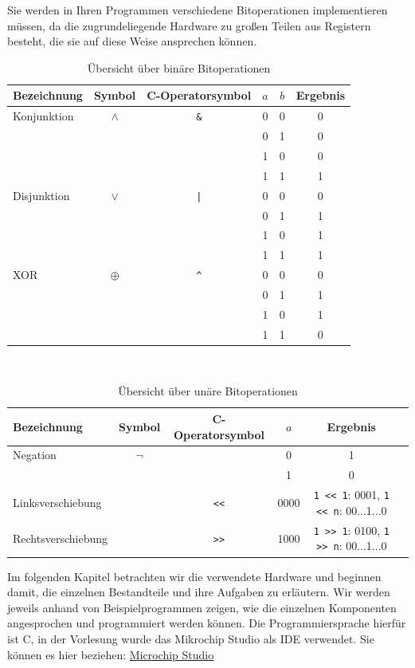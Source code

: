 \documentclass[11pt,a4paper]{scrartcl}
\begin{document}
Sie werden in Ihren Programmen verschiedene Bitoperationen implementieren müssen, da die zugrundeliegende Hardware zu großen Teilen aus Registern besteht, die sie auf diese Weise ansprechen können.
\begin{table}[h]
\centering
\begin{tabular}{|l|c|c|c|c|c|}
\hline
Bezeichnung & Symbol & C-Operatorsymbol & $a$ & $b$ & Ergebnis \\
\hline
Konjunktion & $\land$ & \texttt{\&} & 0 & 0 & 0 \\
&&&0 & 1 & 0 \\
&&&1 & 0 & 0 \\
&&&1 & 1 & 1 \\
\hline
Disjunktion & $\lor$ & \texttt{|} & 0 & 0 & 0 \\
&&&0 & 1 & 1 \\
&&&1 & 0 & 1 \\
&&&1 & 1 & 1 \\
\hline
XOR & $\oplus$ & \texttt{\^} & 0 & 0 & 0 \\
&&&0 & 1 & 1 \\
&&&1 & 0 & 1 \\
&&&1 & 1 & 0 \\
\hline
\end{tabular}
\caption{Übersicht über binäre Bitoperationen}
\end{table} \\

\begin{table}[h]
\centering
\begin{tabular}{|l|c|c|c|c|c|}
\hline
Bezeichnung & Symbol & C-Operatorsymbol & $a$ & Ergebnis \\
\hline
Negation & $\lnot$ & \texttt{~} & 0 & 1 \\
&&&1 & 0 \\
\hline
Linksverschiebung & &\texttt{<<} & 0000 & \texttt{1 << 1}: 0001, \texttt{1 << n}: 00...1...0 \\
\hline
Rechtsverschiebung & & \texttt{>>} & 1000 & \texttt{1 >> 1}: 0100, \texttt{1 >> n}: 00...1...0 \\
\hline
\end{tabular}
\caption{Übersicht über unäre Bitoperationen}
\end{table}

Im folgenden Kapitel betrachten wir die verwendete Hardware und beginnen damit, die einzelnen Bestandteile und ihre Aufgaben zu erläutern. Wir werden jeweils anhand von Beispielprogrammen zeigen, wie die einzelnen Komponenten angesprochen und programmiert werden können. Die Programmiersprache hierfür ist C, in der Vorlesung wurde das {\glqq}Mikrochip Studio{\grqq} als IDE verwendet. Sie können es hier beziehen: 
\href{https://www.microchip.com/en-us/development-tools-tools-and-software/microchip-studio-for-avr-and-sam-devices}{Microchip Studio}
\end{document}
